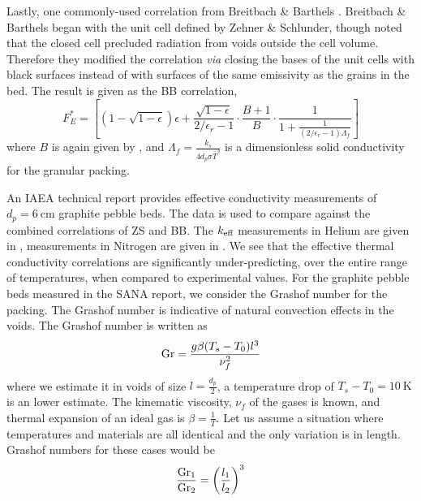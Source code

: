 Lastly, one commonly-used correlation from Breitbach \& Barthels \cite{breitbach1980radiant}. Breitbach \& Barthels began with the unit cell defined by Zehner \& Schlunder, though noted that the closed cell precluded radiation from voids outside the cell volume. Therefore they modified the correlation \textit{via} closing the bases of the unit cells with black surfaces instead of with surfaces of the same emissivity as the grains in the bed. The result is given as the BB correlation,\cite{breitbach1980radiant}
\begin{equation}
    F_E^* = \left[\left(1-\sqrt{1-\epsilon}\right)\epsilon + \frac{\sqrt{1-\epsilon}}{2/\epsilon_r - 1}\cdot\frac{B+1}{B}\cdot\frac{1}{1+\frac{1}{(2/\epsilon_r - 1)\Lambda_f}} \right]
\end{equation}
where $B$ is again given by , and $\Lambda_f = \frac{k_s}{4d_p\sigma\bar{T}^3}$ is a dimensionless solid conductivity for the granular packing.

An IAEA technical report provides effective conductivity measurements of $d_p = \SI{6}{\centi\meter}$ graphite pebble beds\cite{Report2000}. The data is used to compare against the combined correlations of ZS and BB. The $k_\text{eff}$ measurements in Helium are given in , measurements in Nitrogen are given in . We see that the effective thermal conductivity correlations are significantly under-predicting, over the entire range of temperatures, when compared to experimental values. For the graphite pebble beds measured in the SANA report, we consider the Grashof number for the packing. The Grashof number is indicative of natural convection effects in the voids. The Grashof number is written as
\begin{equation}
    \mathrm{Gr} = \frac{g\beta(T_s-T_0)l^3}{\nu_f^2}
\end{equation}
where we estimate it in voids of size $l = \frac{d_p}{2}$, a temperature drop of $T_s-T_0 = \SI{10}{\kelvin}$ is an lower estimate. The kinematic viscosity, $\nu_f$ of the gases is known, and thermal expansion of an ideal gas is $\beta = \frac{1}{T}$. Let us assume a situation where temperatures and materials are all identical and the only variation is in length. Grashof numbers for these cases would be
\begin{equation}
    \frac{\mathrm{Gr}_1}{\mathrm{Gr}_2} = \left(\frac{l_1}{l_2}\right)^3
\end{equation}

